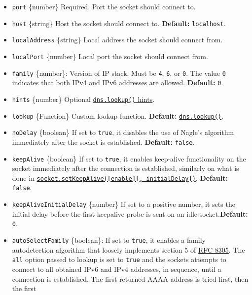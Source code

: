 \begin{itemize}
\tightlist
\item
  \texttt{port} \{number\} Required. Port the socket should connect to.
\item
  \texttt{host} \{string\} Host the socket should connect to.
  \textbf{Default:}
  \texttt{\textquotesingle{}localhost\textquotesingle{}}.
\item
  \texttt{localAddress} \{string\} Local address the socket should
  connect from.
\item
  \texttt{localPort} \{number\} Local port the socket should connect
  from.
\item
  \texttt{family} \{number\}: Version of IP stack. Must be \texttt{4},
  \texttt{6}, or \texttt{0}. The value \texttt{0} indicates that both
  IPv4 and IPv6 addresses are allowed. \textbf{Default:} \texttt{0}.
\item
  \texttt{hints} \{number\} Optional
  \href{dns.md\#supported-getaddrinfo-flags}{\texttt{dns.lookup()}
  hints}.
\item
  \texttt{lookup} \{Function\} Custom lookup function. \textbf{Default:}
  \href{dns.md\#dnslookuphostname-options-callback}{\texttt{dns.lookup()}}.
\item
  \texttt{noDelay} \{boolean\} If set to \texttt{true}, it disables the
  use of Nagle's algorithm immediately after the socket is established.
  \textbf{Default:} \texttt{false}.
\item
  \texttt{keepAlive} \{boolean\} If set to \texttt{true}, it enables
  keep-alive functionality on the socket immediately after the
  connection is established, similarly on what is done in
  \hyperref[socketsetkeepaliveenable-initialdelay]{\texttt{socket.setKeepAlive({[}enable{]}{[},\ initialDelay{]})}}.
  \textbf{Default:} \texttt{false}.
\item
  \texttt{keepAliveInitialDelay} \{number\} If set to a positive number,
  it sets the initial delay before the first keepalive probe is sent on
  an idle socket.\textbf{Default:} \texttt{0}.
\item
  \texttt{autoSelectFamily} \{boolean\}: If set to \texttt{true}, it
  enables a family autodetection algorithm that loosely implements
  section 5 of \href{https://www.rfc-editor.org/rfc/rfc8305.txt}{RFC
  8305}. The \texttt{all} option passed to lookup is set to
  \texttt{true} and the sockets attempts to connect to all obtained IPv6
  and IPv4 addresses, in sequence, until a connection is established.
  The first returned AAAA address is tried first, then the first

\end{itemize}
